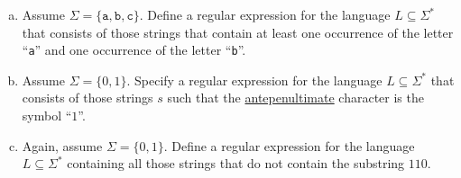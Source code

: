 \exerciseEng
\begin{enumerate}[(a)]
\item Assume \( \Sigma = \{ \mathtt{a}, \mathtt{b}, \mathtt{c} \} \). Define a regular expression for the language \( L \subseteq \Sigma^* \) that consists of those strings that contain at least one occurrence of the letter ``\texttt{a}'' and one occurrence of the letter ``\texttt{b}''.

\item Assume \( \Sigma = \{ 0, 1 \} \). Specify a regular expression for the language \( L \subseteq \Sigma^* \) that consists of those strings \( s \) such that the \href{https://dictionary.cambridge.org/dictionary/english/antepenultimate}{antepenultimate} character is the symbol ``\( 1 \)''.

\item Again, assume \( \Sigma = \{ 0, 1 \} \). Define a regular expression for the language \( L \subseteq \Sigma^* \) containing all those strings that do not contain the substring \( 110 \).



\end{enumerate}
